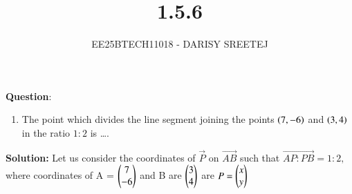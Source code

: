 \documentclass[journal]{IEEEtran}
\begin{document}

\vspace{3cm}

\title{1.5.6}
\author{EE25BTECH11018 - DARISY SREETEJ}
{\let\newpage\relax\maketitle}

\renewcommand{\thefigure}{\theenumi}
\renewcommand{\thetable}{\theenumi}
\setlength{\intextsep}{10pt} %


\renewcommand{\thetable}{\theenumi}


\textbf{Question}:\\
\begin{enumerate}
\item The point which divides the line segment joining the points $\left(7,-6\right)$ and $\left(3, 4\right)$ in the ratio $1 : 2$ is \dots.
\end{enumerate}

\quad

\textbf{Solution:}
Let us consider the coordinates of $\vec{P}$  on $\vec{AB}$ such that $\vec{AP:PB}=1:2 ,$ where coordinates of A = $\begin{pmatrix}7\\-6\end{pmatrix}$ and B are $\begin{pmatrix}3\\4\end{pmatrix}$ are 
$P=\begin{pmatrix}x\\y\end{pmatrix}$
\end{document}
